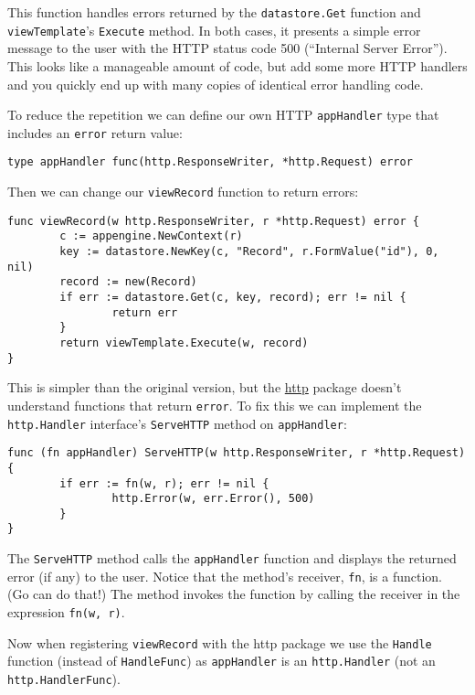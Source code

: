 This function handles errors returned by the \texttt{datastore.Get}
function and \texttt{viewTemplate}'s \texttt{Execute} method. In both
cases, it presents a simple error message to the user with the HTTP
status code 500 (``Internal Server Error''). This looks like a
manageable amount of code, but add some more HTTP handlers and you
quickly end up with many copies of identical error handling code.

To reduce the repetition we can define our own HTTP \texttt{appHandler}
type that includes an \texttt{error} return value:

\begin{Verbatim}[frame=single]
type appHandler func(http.ResponseWriter, *http.Request) error
\end{Verbatim}

Then we can change our \texttt{viewRecord} function to return errors:

\begin{Verbatim}[frame=single]
func viewRecord(w http.ResponseWriter, r *http.Request) error {
        c := appengine.NewContext(r)
        key := datastore.NewKey(c, "Record", r.FormValue("id"), 0, nil)
        record := new(Record)
        if err := datastore.Get(c, key, record); err != nil {
                return err
        }
        return viewTemplate.Execute(w, record)
}
\end{Verbatim}

This is simpler than the original version, but the
\href{http://golang.org/pkg/net/http/}{http} package doesn't understand functions that
return \texttt{error}. To fix this we can implement the
\texttt{http.Handler} interface's \texttt{ServeHTTP} method on
\texttt{appHandler}:

\begin{Verbatim}[frame=single]
func (fn appHandler) ServeHTTP(w http.ResponseWriter, r *http.Request) {
        if err := fn(w, r); err != nil {
                http.Error(w, err.Error(), 500)
        }
}
\end{Verbatim}

The \texttt{ServeHTTP} method calls the \texttt{appHandler} function and
displays the returned error (if any) to the user. Notice that the
method's receiver, \texttt{fn}, is a function. (Go can do that!) The
method invokes the function by calling the receiver in the expression
\texttt{fn(w, r)}.

Now when registering \texttt{viewRecord} with the http package we use
the \texttt{Handle} function (instead of \texttt{HandleFunc}) as
\texttt{appHandler} is an \texttt{http.Handler} (not an
\texttt{http.HandlerFunc}).

